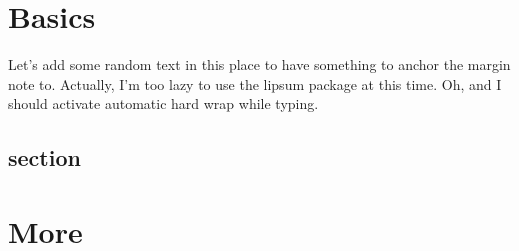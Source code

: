 \chapter{Basics}
\par Let's add some random text in this place to have something to anchor the
  margin note to. Actually, I'm too lazy to use the lipsum package at this
  time. Oh, and I should activate automatic hard wrap while typing.
\lipsum[1-13]
\section{section}
\lipsum

\chapter{More}
\lipsum